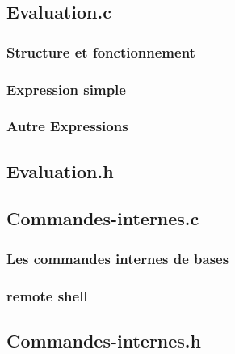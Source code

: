 \documentclass[12pt]{article}
\begin{document}
\subsection{Evaluation.c}

\subsubsection{Structure et fonctionnement}
\label{struct et fonctionnement}
\begin{alltt}
 
\end{alltt}

\subsubsection{Expression simple}
\label{expr_simple}
\begin{alltt}
 
\end{alltt}

\subsubsection{Autre Expressions}
\label{autre expression}
\begin{alltt}
 
\end{alltt}

\subsection{Evaluation.h}
\label{Eval.h}
\begin{alltt}
 
\end{alltt}

\subsection{Commandes-internes.c}

\subsubsection{Les commandes internes de bases}
\label{cmd_de_base}
\begin{alltt}
 
\end{alltt}

\subsubsection{remote shell}
\label{remote shell}
\begin{alltt}
 
\end{alltt}

\subsection{Commandes-internes.h}
\label{cmd_interne.h}
\begin{alltt}
 
\end{alltt}
\end{document}
